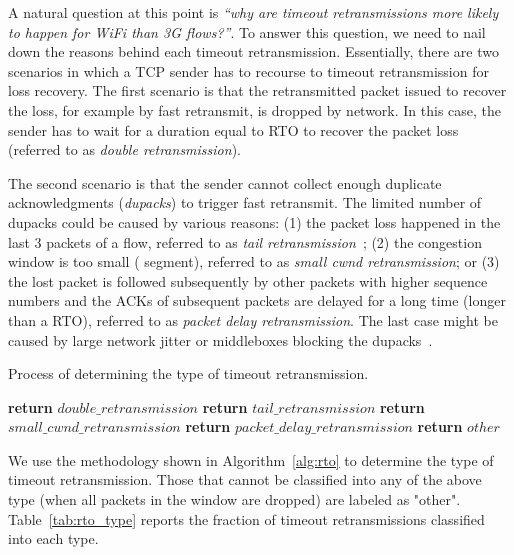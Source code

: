A natural question at this point is \textit{``why are timeout retransmissions more likely to happen for WiFi than 3G flows?''}. To answer this question, we need to nail down the reasons behind each timeout retransmission. Essentially, there are two scenarios in which a TCP sender has to recourse to timeout retransmission for loss recovery. The first scenario is that the retransmitted packet issued to recover the loss, for example by fast retransmit, is dropped by network. In this case, the sender has to wait for a duration equal to RTO to recover the packet loss (referred to as \emph{double retransmission}). 

The second scenario is that the sender cannot collect enough duplicate acknowledgments (\emph{dupacks}) to trigger fast retransmit. The limited number of dupacks could be caused by various reasons: (1) the packet loss happened in the last 3 packets of a flow, referred to as \emph{tail retransmission}~\cite{flach2013reducing}; (2) the congestion window is too small ( segment), referred to as \emph{small cwnd retransmission}; or (3) the lost packet is followed subsequently by other packets with higher sequence numbers and the ACKs of subsequent packets are delayed for a long time (longer than a RTO), referred to as \emph{packet delay retransmission}. The last case might be caused by large network jitter or middleboxes blocking the dupacks~\cite{honda2011isit}.

\begin{algorithm}
	\caption{Process of determining the type of timeout retransmission.}
	\label{alg:rto}
	\begin{algorithmic}[1]
				\State \textbf{return} $double\_retransmission$
				\State \textbf{return} $tail\_retransmission$
				\State \textbf{return} $small\_cwnd\_retransmission$
				\State \textbf{return} $packet\_delay\_retransmission$
			\Else
				\State \textbf{return} $other$
			\EndIf
		\EndProcedure
	\end{algorithmic}
\end{algorithm}

We use the methodology shown in Algorithm~\ref{alg:rto} to determine the type of timeout retransmission. Those that cannot be classified into any of the above type (\eg when all packets in the window are dropped) are labeled as "other". Table~\ref{tab:rto_type} reports the fraction of timeout retransmissions classified into each type.

